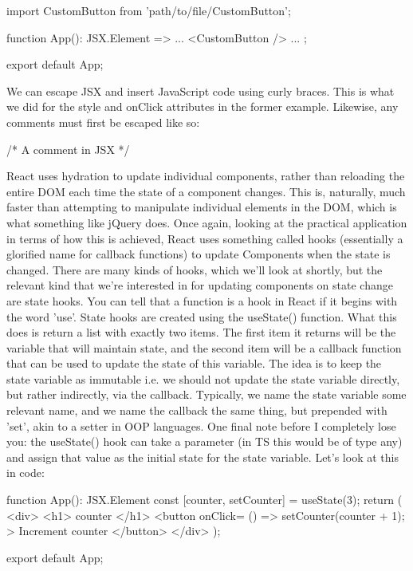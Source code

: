 \documentclass{article}
\begin{document}
\begin{tslst}

import CustomButton from 'path/to/file/CustomButton';

function App(): JSX.Element => {
    ...
    <CustomButton />
    ...
};

export default App;

\end{tslst}

We can escape JSX and insert JavaScript code using curly braces. This is what we did for the style and
onClick attributes in the former example. Likewise, any comments must first be escaped like so:

\begin{tslst}

{ /* A comment in JSX */ }

\end{tslst}

React uses hydration to update individual components, rather than reloading the entire DOM each time the state
of a component changes. This is, naturally, much faster than attempting to manipulate individual elements in
the DOM, which is what something like jQuery does. Once again, looking at the practical application in terms of
how this is achieved, React uses something called hooks (essentially a glorified name for callback functions)
to update Components when the state is changed. There are many kinds of hooks, which we'll look at shortly, but
the relevant kind that we're interested in for updating components on state change are state hooks. You can
tell that a function is a hook in React if it begins with the word 'use'. State hooks are created using the
useState() function. What this does is return a list with exactly two items. The first item it returns will be
the variable that will maintain state, and the second item will be a callback function that can be used to
update the state of this variable. The idea is to keep the state variable as immutable i.e. we should not
update the state variable directly, but rather indirectly, via the callback. Typically, we name the state
variable some relevant name, and we name the callback the same thing, but prepended with 'set', akin to a
setter in OOP languages. One final note before I completely lose you: the useState() hook can take a parameter
(in TS this would be of type any) and assign that value as the initial state for the state variable. Let's
look at this in code:

\begin{tslst}

function App(): JSX.Element {
    const [counter, setCounter] = useState(3);
    return (
        <div>
            <h1>{ counter }</h1>
            <button onClick={ () => { setCounter(counter + 1); } }>
                Increment counter
            </button>
        </div>
    );
}

export default App;

\end{tslst}
\end{document}
